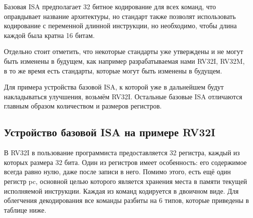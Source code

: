 \documentclass[14pt, russian, onesize]{extreport}
\begin{document}
Базовая ISA предполагает 32 битное кодирование для всех команд, что оправдывает
название архитектуры, но стандарт также позволят использовать кодирование
с переменной длинной инструкции, но необходимо, чтобы длина каждой
была кратна 16 битам.

Отдельно стоит отметить, что некоторые стандарты уже утверждены и не могут быть изменены
в будущем, как например разрабатываемая нами RV32I, RV32M, в то же время
есть стандарты, которые могут быть изменены в будущем.

Для примера устройства базовой ISA, к которой уже в дальнейшем
будут накладываться улучшения, возьмём RV32I. Остальные базовые
ISA отличаются главным образом количеством и размеров регистров.

\subsection*{Устройство базовой ISA на примере RV32I}
В RV32I в пользование программиста предоставляется 32 регистра, каждый
из которых размера 32 бита. Один из регистров имеет особенность: его
содержимое всегда равно нулю, даже после записи в него. Помимо этого,
есть ещё один регистр pc, основной целью которого является хранения
места в памяти текущей исполняемой инструкции. Каждая из команд
кодируется в двоичном виде. Для облегчения декодирования
все команды разбиты на 6 типов, которые приведены в таблице ниже.
\end{document}
